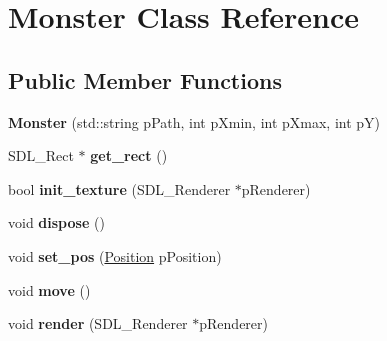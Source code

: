 \hypertarget{classMonster}{}\section{Monster Class Reference}
\label{classMonster}
\subsection*{Public Member Functions}
\begin{DoxyCompactItemize}
\item 
\mbox{\label{classMonster_a2d4e4f5b728a5cc6676fb497d9ece85a}} 
{\bfseries Monster} (std\+::string p\+Path, int p\+Xmin, int p\+Xmax, int pY)
\item 
\mbox{\label{classMonster_a6f2432083dcbfaf37f8949925c3cc536}} 
S\+D\+L\+\_\+\+Rect $\ast$ {\bfseries get\+\_\+rect} ()
\item 
\mbox{\label{classMonster_a0234710fb2fd4e8c7182776bc5b8b511}} 
bool {\bfseries init\+\_\+texture} (S\+D\+L\+\_\+\+Renderer $\ast$p\+Renderer)
\item 
\mbox{\label{classMonster_a9bb1c6ede06cd9a321eba9cfc200b54b}} 
void {\bfseries dispose} ()
\item 
\mbox{\label{classMonster_a3659a2eca9824e0e3e94bdef00617ae0}} 
void {\bfseries set\+\_\+pos} (\hyperlink{classPosition}{Position} p\+Position)
\item 
\mbox{\label{classMonster_a29d08fe330b6cad13e614693f1f3e16f}} 
void {\bfseries move} ()
\item 
\mbox{\label{classMonster_a504a93482b4ad970cc6bcae5e40e26d8}} 
void {\bfseries render} (S\+D\+L\+\_\+\+Renderer $\ast$p\+Renderer)
\end{DoxyCompactItemize}
